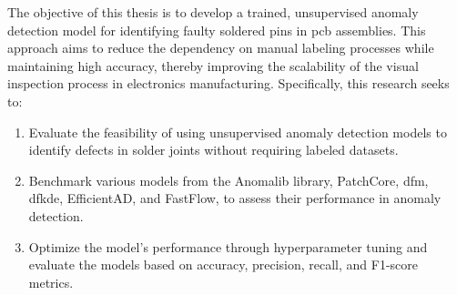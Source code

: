 The objective of this thesis is to develop a trained, unsupervised anomaly detection model for identifying faulty soldered pins in \gls{pcb} assemblies. This approach aims to reduce the dependency on manual labeling processes while maintaining high accuracy, thereby improving the scalability of the visual inspection process in electronics manufacturing. Specifically, this research seeks to:

\begin{enumerate}
    \item Evaluate the feasibility of using unsupervised anomaly detection models to identify defects in solder joints without requiring labeled datasets.

    \item Benchmark various models from the Anomalib library, PatchCore, \gls{dfm}, \gls{dfkde}, EfficientAD, and FastFlow, to assess their performance in anomaly detection.

    \item Optimize the model's performance through hyperparameter tuning and evaluate the models based on accuracy, precision, recall, and F1-score metrics.
\end{enumerate}


